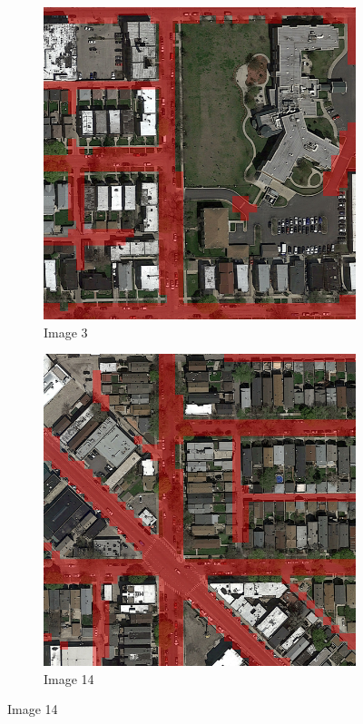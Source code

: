 \documentclass[10pt,conference,compsocconf]{IEEEtran}
\begin{document}
\begin{figure}
    \centering
    \begin{subfigure}[b]{0.45\columnwidth}
        \includegraphics[width=\columnwidth]{figures/submission_selection/images_003.png}
    \caption{Image 3}\label{fig:sub_a}
    \end{subfigure}
    \begin{subfigure}[b]{0.45\columnwidth}
        \includegraphics[width=\columnwidth]{figures/submission_selection/images_014.png}
    \caption{Image 14}\label{fig:sub_b}
    \end{subfigure}


\end{figure}
\end{document}
